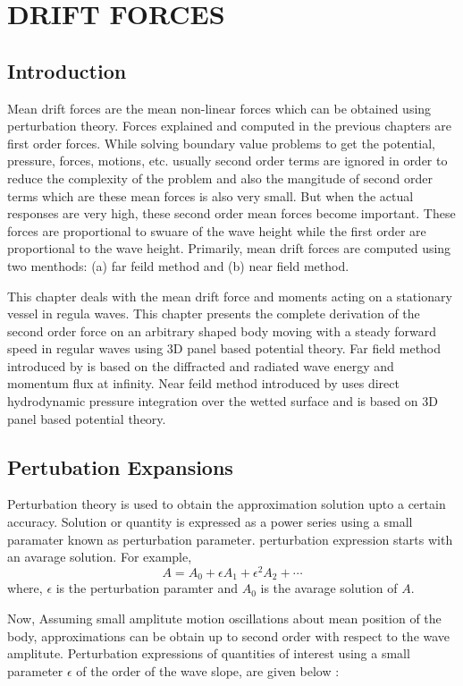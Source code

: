 \chapter{DRIFT FORCES}
\section{Introduction}
Mean drift forces are the mean non-linear forces which can be obtained using perturbation theory. Forces explained and computed in the previous chapters
are first order forces. While solving boundary value problems to get the potential, pressure, forces, motions, etc. usually
second order terms are ignored in order to reduce the complexity of the problem and also the mangitude of
second order terms which are these mean forces is also very small. But when the actual responses are very high,
these second order mean forces become important. These forces are proportional to swuare of the wave height while the 
first order are proportional to the wave height. Primarily, mean drift forces are computed using two menthods:
(a) far feild method and (b) near field method.

This chapter deals with the mean drift force and moments acting on a stationary vessel in regula waves. This chapter
presents the complete derivation of the second order force on an arbitrary shaped body moving with a steady 
forward speed in regular waves using 3D panel based potential theory. Far field method introduced by
\cite{maruo1957excess} is based on the diffracted and radiated wave energy and momentum flux at infinity. Near feild
method introduced by \cite{boese1970einfache} uses direct hydrodynamic pressure integration over the wetted surface and 
is based on 3D panel based potential theory.

\section{Pertubation Expansions}
Perturbation theory is used to obtain the approximation solution upto a certain accuracy. Solution or quantity is 
expressed as a power series using a small paramater known as perturbation parameter. perturbation expression
starts with an avarage solution.
For example, 
\begin{equation}
    A = A_0 + \epsilon A_1 + \epsilon^2 A_2 + \cdots
\end{equation}
where, $\epsilon$ is the perturbation paramter and $A_0$ is the avarage solution of $A$.

Now, Assuming small amplitute motion oscillations about mean position of the body, approximations can be obtain 
up to second order with respect to the wave amplitute. Perturbation expressions of quantities 
of interest using a small parameter $\epsilon$ of the order of the wave slope, are given below :

